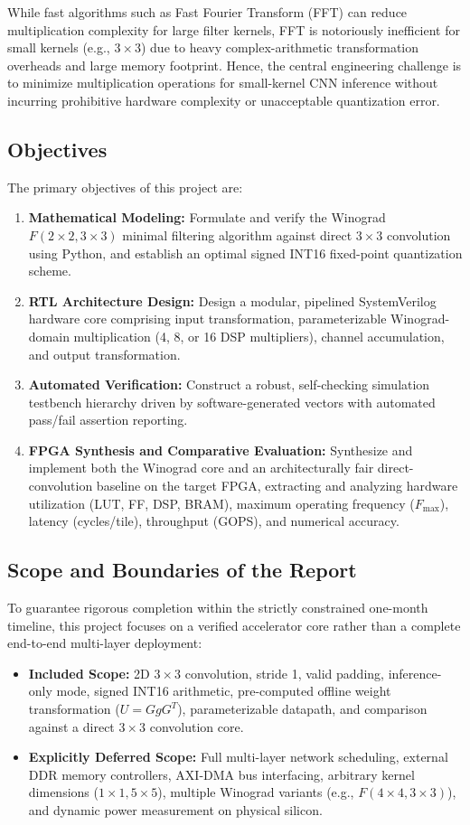 \documentclass[12pt,a4paper]{article}
\begin{document}
While fast algorithms such as Fast Fourier Transform (FFT) can reduce multiplication complexity for large filter kernels, FFT is notoriously inefficient for small kernels (e.g., $3 \times 3$) due to heavy complex-arithmetic transformation overheads and large memory footprint. Hence, the central engineering challenge is to minimize multiplication operations for small-kernel CNN inference without incurring prohibitive hardware complexity or unacceptable quantization error.

\subsection{Objectives}
The primary objectives of this project are:
\begin{enumerate}
    \item \textbf{Mathematical Modeling:} Formulate and verify the Winograd $F(2 \times 2, 3 \times 3)$ minimal filtering algorithm against direct $3 \times 3$ convolution using Python, and establish an optimal signed INT16 fixed-point quantization scheme.
    \item \textbf{RTL Architecture Design:} Design a modular, pipelined SystemVerilog hardware core comprising input transformation, parameterizable Winograd-domain multiplication (4, 8, or 16 DSP multipliers), channel accumulation, and output transformation.
    \item \textbf{Automated Verification:} Construct a robust, self-checking simulation testbench hierarchy driven by software-generated vectors with automated pass/fail assertion reporting.
    \item \textbf{FPGA Synthesis and Comparative Evaluation:} Synthesize and implement both the Winograd core and an architecturally fair direct-convolution baseline on the target FPGA, extracting and analyzing hardware utilization (LUT, FF, DSP, BRAM), maximum operating frequency ($F_{\max}$), latency (cycles/tile), throughput (GOPS), and numerical accuracy.
\end{enumerate}

\subsection{Scope and Boundaries of the Report}
To guarantee rigorous completion within the strictly constrained one-month timeline, this project focuses on a verified accelerator core rather than a complete end-to-end multi-layer deployment:
\begin{itemize}
    \item \textbf{Included Scope:} 2D $3 \times 3$ convolution, stride 1, valid padding, inference-only mode, signed INT16 arithmetic, pre-computed offline weight transformation ($U = G g G^T$), parameterizable datapath, and comparison against a direct $3 \times 3$ convolution core.
    \item \textbf{Explicitly Deferred Scope:} Full multi-layer network scheduling, external DDR memory controllers, AXI-DMA bus interfacing, arbitrary kernel dimensions ($1 \times 1, 5 \times 5$), multiple Winograd variants (e.g., $F(4 \times 4, 3 \times 3)$), and dynamic power measurement on physical silicon.
\end{itemize}
\end{document}
